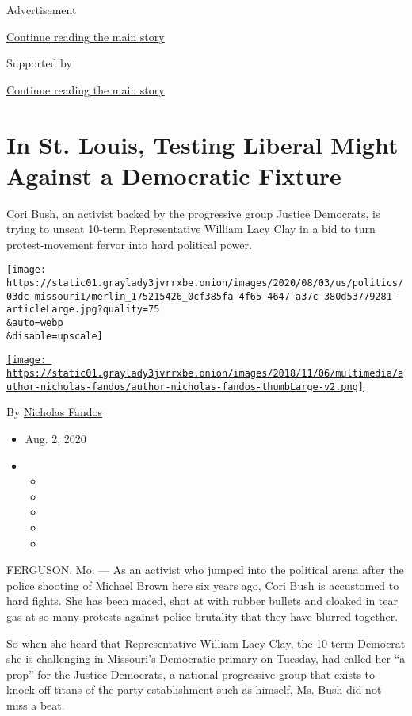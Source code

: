 Advertisement

\protect\hyperlink{after-top}{Continue reading the main story}

Supported by

\protect\hyperlink{after-sponsor}{Continue reading the main story}

\hypertarget{in-st-louis-testing-liberal-might-against-a-democratic-fixture}{%
\section{In St. Louis, Testing Liberal Might Against a Democratic
Fixture}\label{in-st-louis-testing-liberal-might-against-a-democratic-fixture}}

Cori Bush, an activist backed by the progressive group Justice
Democrats, is trying to unseat 10-term Representative William Lacy Clay
in a bid to turn protest-movement fervor into hard political power.

\texttt{[image: https://static01.graylady3jvrrxbe.onion/images/2020/08/03/us/politics/03dc-missouri1/merlin\_175215426\_0cf385fa-4f65-4647-a37c-380d53779281-articleLarge.jpg?quality=75\\\&auto=webp\\\&disable=upscale]}

\href{https://www.nytimes3xbfgragh.onion/by/nicholas-fandos}{\texttt{[image: https://static01.graylady3jvrrxbe.onion/images/2018/11/06/multimedia/author-nicholas-fandos/author-nicholas-fandos-thumbLarge-v2.png]}}

By \href{https://www.nytimes3xbfgragh.onion/by/nicholas-fandos}{Nicholas
Fandos}

\begin{itemize}
\item
  Aug. 2, 2020
\item
  \begin{itemize}
  \item
  \item
  \item
  \item
  \item
  \end{itemize}
\end{itemize}

FERGUSON, Mo. --- As an activist who jumped into the political arena
after the police shooting of Michael Brown here six years ago, Cori Bush
is accustomed to hard fights. She has been maced, shot at with rubber
bullets and cloaked in tear gas at so many protests against police
brutality that they have blurred together.

So when she heard that Representative William Lacy Clay, the 10-term
Democrat she is challenging in Missouri's Democratic primary on Tuesday,
had called her ``a prop'' for the Justice Democrats, a national
progressive group that exists to knock off titans of the party
establishment such as himself, Ms. Bush did not miss a beat.

